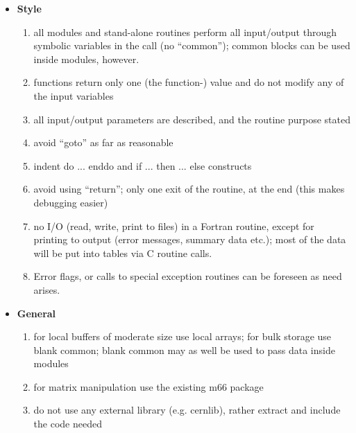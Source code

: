 \begin{itemize}
   \item \textbf{ Style}
     \begin{enumerate}
        \item all modules and stand-alone routines perform all
          input/output through symbolic variables in the call (no
          ``common''); common blocks can be used inside modules,
          however. 
	\item functions return only one (the function-) value and do not
          modify any of the input variables 
	\item all input/output parameters are described, and the routine
          purpose stated 
	\item avoid ``goto'' as far as reasonable
	\item indent do ... enddo and if ... then ... else constructs 
	\item avoid using ``return''; only one exit of the routine, at
          the end (this makes debugging easier)   
	\item no I/O (read, write, print to files) in a Fortran routine,
          except for printing to output (error messages, summary data
          etc.); most of the data will be put into tables via C routine
          calls. 
	\item Error flags, or calls to special exception routines can be
          foreseen as need arises. 
     \end{enumerate}

   \item \textbf{ General}
     \begin{enumerate}
        \item for local buffers of moderate size use local arrays; for
          bulk storage use blank common; blank common may as
          well be used to pass data inside modules 
	\item for matrix manipulation use the existing m66 package
	\item do not use any external library (e.g. cernlib), rather
          extract and include the code needed   
     \end{enumerate}


\end{itemize}
